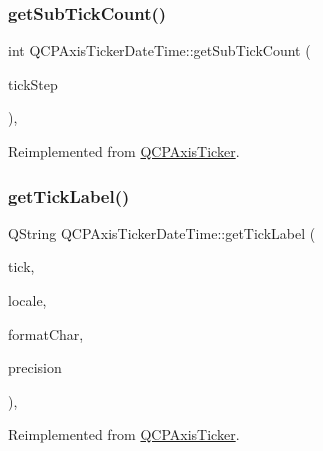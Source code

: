 \subsubsection{\texorpdfstring{get\+Sub\+Tick\+Count()}{getSubTickCount()}}
{\footnotesize\ttfamily int Q\+C\+P\+Axis\+Ticker\+Date\+Time\+::get\+Sub\+Tick\+Count (\begin{DoxyParamCaption}\item[{double}]{tick\+Step }\end{DoxyParamCaption})\hspace{0.3cm}{\ttfamily [protected]}, {\ttfamily [virtual]}}



Reimplemented from \hyperlink{class_q_c_p_axis_ticker_a4ccc403ced7a1457ce6ba293509933c8}{Q\+C\+P\+Axis\+Ticker}.

\mbox{\label{class_q_c_p_axis_ticker_date_time_a4dc6a03f7ea5c619477528a683ed5c18}} 
\subsubsection{\texorpdfstring{get\+Tick\+Label()}{getTickLabel()}}
{\footnotesize\ttfamily Q\+String Q\+C\+P\+Axis\+Ticker\+Date\+Time\+::get\+Tick\+Label (\begin{DoxyParamCaption}\item[{double}]{tick,  }\item[{const Q\+Locale \&}]{locale,  }\item[{Q\+Char}]{format\+Char,  }\item[{int}]{precision }\end{DoxyParamCaption})\hspace{0.3cm}{\ttfamily [protected]}, {\ttfamily [virtual]}}



Reimplemented from \hyperlink{class_q_c_p_axis_ticker_a8201eb4aa8be192bf786b126eb5ee089}{Q\+C\+P\+Axis\+Ticker}.

\mbox{\label{class_q_c_p_axis_ticker_date_time_a0560c14a3f87bb99ab136aca8321b32a}} 
